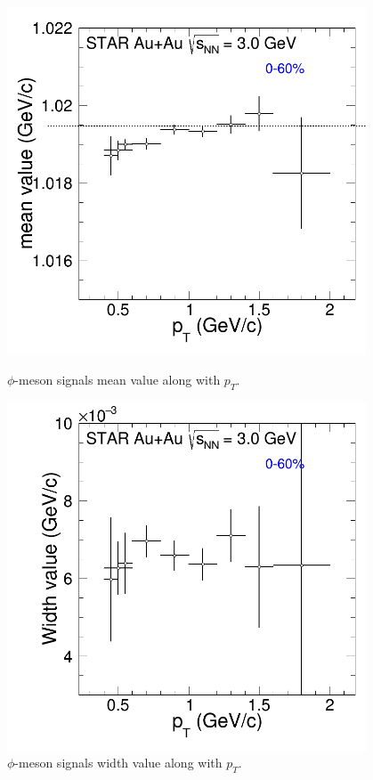 \begin{figure}[htbp]
\begin{minipage}[htbp]{0.55\linewidth}
\centering
\includegraphics[width=0.95\textwidth]{chapterY/fig/fig1_mean_0.png}
\caption{$\phi$-meson signals mean value along with $p_T$. \label{fig:mixedEvent_mean}}
\end{minipage}
\hfill
\begin{minipage}[htbp]{0.55\linewidth}
\centering
\includegraphics[width=0.95\textwidth]{chapterY/fig/fig1_width_0.png} 
\caption{$\phi$-meson signals width value along with $p_T$. \label{fig:mixedEvent_width}}
\end{minipage}
\end{figure}


